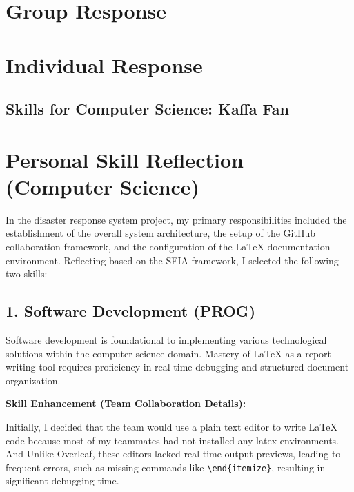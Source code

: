 \documentclass[a4paper, 11pt]{report}
\begin{document}

\tableofcontents

\newpage

\section{Group Response}

\newpage
\section{Individual Response}

\subsection{Skills for Computer Science: Kaffa Fan}
\section*{Personal Skill Reflection (Computer Science)}

In the disaster response system project, my primary responsibilities included the establishment of the overall system architecture, the setup of the GitHub collaboration framework, and the configuration of the LaTeX documentation environment. Reflecting based on the SFIA framework, I selected the following two skills:

\subsection*{1. Software Development (PROG)}

Software development is foundational to implementing various technological solutions within the computer science domain. Mastery of LaTeX as a report-writing tool requires proficiency in real-time debugging and structured document organization.

\textbf{Skill Enhancement (Team Collaboration Details):}

Initially, I decided that the team would use a plain text editor to write LaTeX code because most of my teammates had not installed any latex environments. And Unlike Overleaf, these editors lacked real-time output previews, leading to frequent errors, such as missing commands like \texttt{\textbackslash end\{itemize\}}, resulting in significant debugging time.
\end{document}
